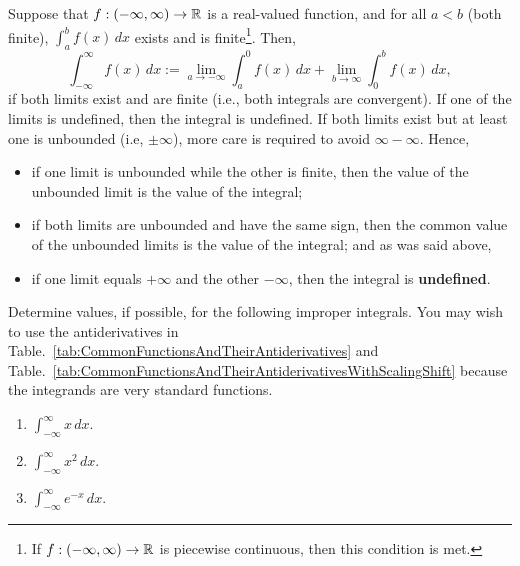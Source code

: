 \bigskip

\begin{tcolorbox}[colback=mylightblue, title = {\bf Unbounded Upper and Lower Limit: Take 2}, breakable]
\begin{definition}
\label{def:unboundedLimitsOfIntegrationTake2}

Suppose that  $f:(-\infty, \infty) \to  \mathbb R$ is a real-valued function, and for all $a<b$ (both finite), $\int_a^b f(x) \, dx$ exists and is finite\footnote{If $f:(-\infty, \infty) \to  \mathbb R$ is piecewise continuous, then this condition is met.}. Then,
\begin{equation}
    \label{eq:unboundedLowerUpperLimit}
    \int_{-\infty}^\infty f(x) \, dx := \lim_{a \to -\infty} \int_a^0 f(x) \, dx + \lim_{b \to \infty} \int_0^b f(x) \, dx,
\end{equation}
if both limits exist and are finite (i.e., both integrals are convergent). If one of the limits is undefined, then the integral is undefined. If both limits exist but at least one is unbounded (i.e, $\pm \infty$), more care is required to avoid $\infty - \infty$. Hence,
\begin{itemize}
    \item if one limit is unbounded while the other is finite, then the value of the unbounded limit is the value of the integral;
    \item if both limits are unbounded and have the same sign, then the common value of the unbounded limits is the value of the integral; and as was said above,
    \item if one limit equals $+\infty$ and the other $-\infty$, then the integral is \textbf{undefined}.
\end{itemize} 
\end{definition}

\end{tcolorbox}


\bigskip

\begin{example} Determine values, if possible, for the following improper integrals. You may wish to use the antiderivatives in Table.~\ref{tab:CommonFunctionsAndTheirAntiderivatives} and Table.~\ref{tab:CommonFunctionsAndTheirAntiderivativesWithScalingShift} because the integrands are very standard functions.
 \begin{enumerate}
\renewcommand{\labelenumi}{(\alph{enumi})}
\setlength{\itemsep}{.2cm}

    \item $\int_{-\infty}^\infty x \, dx$.

    \item $\int_{-\infty}^\infty x^2 \, dx$.


    \item $\int_{-\infty}^\infty e^{-x} \, dx$.

\end{enumerate}
    
\end{example}

